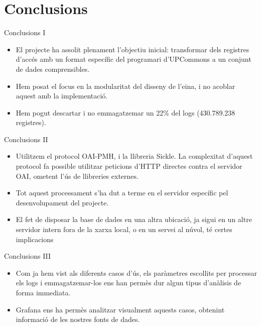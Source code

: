 \section{Conclusions}\label{sec:conclusions}

\begin{frame}{Conclusions I}

\begin{itemize}
    \item El projecte ha assolit plenament l’objectiu inicial: transformar dels registres d’accés amb un format específic del programari d’UPCommons a un conjunt de dades comprensibles.
    \item Hem posat el focus en la modularitat del disseny de l'eina, i no acoblar aquest amb la implementació.
    \item Hem pogut descartar i no emmagatzemar un 22\% del logs (430.789.238 registres).
\end{itemize}

\end{frame}

\begin{frame}{Conclusions II}

    \begin{itemize}
        \item Utilitzem el protocol OAI-PMH, i la llibreria Sickle.
        La complexitat d’aquest protocol fa possible utilitzar peticions d’HTTP directes contra el servidor OAI, ometent l’ús de llibreries externes.
        \item Tot aquest processament s’ha dut a terme en el servidor específic pel desenvolupament del projecte.
        \item El fet de disposar la base de dades en una altra ubicació, ja sigui en un altre servidor intern fora de la xarxa local, o en un servei al núvol, té certes implicacions
    \end{itemize}

\end{frame}

\begin{frame}{Conclusions III}

    \begin{itemize}
        \item Com ja hem vist als diferents casos d’ús, els paràmetres escollits per processar els logs i emmagatzemar-los ens han permès dur algun tipus d’anàlisis de forma immediata.
        \item Grafana ens ha permès analitzar visualment aquests casos, obtenint informació de les nostres fonts de dades.
    \end{itemize}

\end{frame}